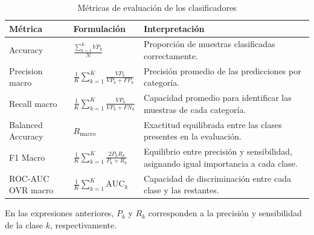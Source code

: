 \begin{table}[htbp]
	\centering
	
	\caption{Métricas de evaluación de los clasificadores}
	\label{tab:metricas_clasificacion_ia}
	
	\renewcommand{\arraystretch}{1.8}
	\small
	
	\begin{tabularx}{\textwidth}{
			|>{\raggedright\arraybackslash}p{3cm}|
			>{\centering\arraybackslash}p{4.5cm}|
			>{\raggedright\arraybackslash}X|
		}
		
		\hline
		
		\rowcolor{gray!15}
		\textbf{Métrica} &
		\textbf{Formulación} &
		\textbf{Interpretación} \\ \hline
		
		Accuracy &
		$\displaystyle
		\frac{\sum_{k=1}^{K}VP_k}{N}$ &
		Proporción de muestras clasificadas
		correctamente. \\ \hline
		
		Precision macro &
		$\displaystyle
		\frac{1}{K}\sum_{k=1}^{K}
		\frac{VP_k}{VP_k+FP_k}$ &
		Precisión promedio de las predicciones
		por categoría. \\ \hline
		
		Recall macro &
		$\displaystyle
		\frac{1}{K}\sum_{k=1}^{K}
		\frac{VP_k}{VP_k+FN_k}$ &
		Capacidad promedio para identificar
		las muestras de cada categoría.
		\\ \hline
		
		Balanced Accuracy &
		$\displaystyle R_{\mathrm{macro}}$ &
		Exactitud equilibrada entre las clases
		presentes en la evaluación. \\ \hline
		
		F1 Macro &
		$\displaystyle
		\frac{1}{K}\sum_{k=1}^{K}
		\frac{2P_kR_k}{P_k+R_k}$ &
		Equilibrio entre precisión y sensibilidad,
		asignando igual importancia a cada clase.
		\\ \hline
		
		ROC-AUC OVR macro &
		$\displaystyle
		\frac{1}{K}\sum_{k=1}^{K}\mathrm{AUC}_k$ &
		Capacidad de discriminación entre
		cada clase y las restantes. \\ \hline
		
	\end{tabularx}
	
\end{table}

\FloatBarrier

En las expresiones anteriores, $P_k$ y $R_k$ corresponden a la precisión y sensibilidad de la clase $k$, respectivamente.

